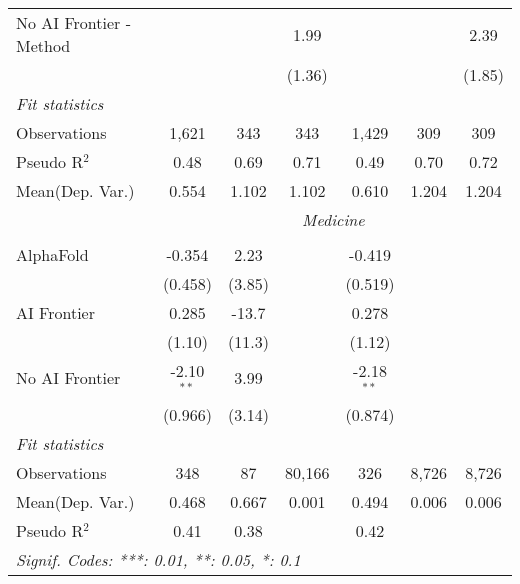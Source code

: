 \begin{tabular}{lcccccc}
   No AI Frontier - Method &              &              & 1.99          &              &              & 2.39\\   
                           &              &              & (1.36)        &              &              & (1.85)\\   
   \midrule
   \emph{Fit statistics}\\
   Observations            & 1,621        & 343          & 343           & 1,429        & 309          & 309\\  
   Pseudo R$^2$            & 0.48         & 0.69         & 0.71          & 0.49         & 0.70         & 0.72\\  
   
Mean(Dep. Var.) & 0.554 & 1.102 & 1.102 & 0.610 & 1.204 & 1.204 \\
 & \multicolumn{6}{c}{\textit{Medicine}} \\ \\
   AlphaFold      & -0.354       & 2.23    &        & -0.419       &       &   \\   
                  & (0.458)      & (3.85)  &        & (0.519)      &       &   \\   
   AI Frontier    & 0.285        & -13.7   &        & 0.278        &       &   \\   
                  & (1.10)       & (11.3)  &        & (1.12)       &       &   \\   
   No AI Frontier & -2.10$^{**}$ & 3.99    &        & -2.18$^{**}$ &       &   \\   
                  & (0.966)      & (3.14)  &        & (0.874)      &       &   \\   
   \midrule
   \emph{Fit statistics}\\
   Observations   & 348          & 87      & 80,166 & 326          & 8,726 & 8,726\\  
Mean(Dep. Var.) & 0.468 & 0.667 & 0.001 & 0.494 & 0.006 & 0.006 \\
   Pseudo R$^2$   & 0.41         & 0.38    &        & 0.42         &       & \\  
   \midrule \midrule
   \multicolumn{7}{l}{\emph{Signif. Codes: ***: 0.01, **: 0.05, *: 0.1}}\\
\end{tabular}
\par\endgroup
